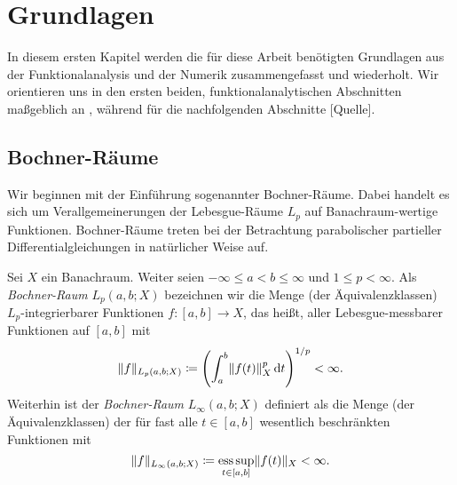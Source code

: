 
\chapter{Grundlagen} %
\label{cha:grundlagen}


In diesem ersten Kapitel werden die für diese Arbeit benötigten Grundlagen aus der Funktionalanalysis und der Numerik zusammengefasst und wiederholt.
Wir orientieren uns in den ersten beiden, funktionalanalytischen Abschnitten maßgeblich an \textcite{Dautray:1992by,Lions:1972tg}, während für die nachfolgenden Abschnitte [Quelle].


\section{Bochner-Räume} %
\label{sec:bochner_r_ume}

Wir beginnen mit der Einführung sogenannter Bochner-Räume.
Dabei handelt es sich um Verallgemeinerungen der Lebesgue-Räume $L_{p}$ auf Banachraum-wertige Funktionen.
Bochner-Räume treten bei der Betrachtung parabolischer partieller Differentialgleichungen in natürlicher Weise auf.

\begin{Definition}
\label{definition:gl:bochner_raum}
    Sei $X$ ein Banachraum.
    Weiter seien $- \infty \leq a < b \leq \infty$ und $1 \leq p < \infty$.
    Als \emph{Bochner-Raum} $L_{p}(a, b; X)$ bezeichnen wir die Menge (der Äquivalenzklassen) $L_{p}$-integrierbarer Funktionen $f \colon [a, b] \to X$, das heißt, aller Lebesgue-messbarer Funktionen auf $[a, b]$ mit
    \begin{equation}
        \lVert f\rVert_{L_{p}(a, b; X)} \coloneqq \left( \int_{a}^{b} \lVert f(t)\rVert_{X}^{p} \mathop{}\!\mathrm{d} t \right)^{1 / p} < \infty.
    \end{equation}
    Weiterhin ist der \emph{Bochner-Raum} $L_{\infty}(a, b; X)$ definiert als die Menge (der Äquivalenzklassen) der für fast alle $t \in [a, b]$ wesentlich beschränkten Funktionen mit
    \begin{equation}
        \lVert f\rVert_{L_{\infty}(a, b; X)} \coloneqq \operatorname*{ess\,sup}_{t \in [a, b]} \lVert f(t)\rVert_{X} < \infty.
    \end{equation}
\end{Definition}

